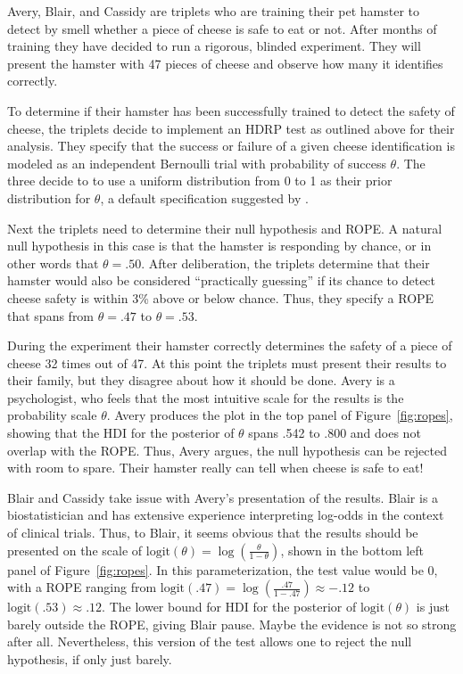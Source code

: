 \documentclass[man]{apa}
\newcommand{\hdr}{HDRP}
\newcommand{\logit}{\text{logit}}
\begin{document}
Avery, Blair, and Cassidy are triplets who are training their pet hamster to detect by smell whether a piece of cheese is safe to eat or not. After months of training they have decided to run a rigorous, blinded experiment. They will present the hamster with 47 pieces of cheese and observe how many it identifies correctly.

To determine if their hamster has been successfully trained to detect the safety of cheese, the triplets decide to implement an \hdr{} test as outlined above for their analysis. They specify that the success or failure of a given cheese identification is modeled as an independent Bernoulli trial with probability of success $\theta$. The three decide to to use a uniform distribution from 0 to 1 as their prior distribution for $\theta$, a default specification suggested by . 

Next the triplets need to determine their null hypothesis and ROPE. A natural null hypothesis in this case is that the hamster is responding by chance, or in other words that $\theta=.50$. After deliberation, the triplets determine that their hamster would also be considered ``practically guessing'' if its chance to detect cheese safety is within 3\% above or below chance. Thus, they specify a ROPE that spans from $\theta=.47$ to $\theta=.53$.

During the experiment their hamster correctly determines the safety of a piece of cheese 32 times out of 47. At this point the triplets must present their results to their family, but they disagree about how it should be done. Avery is a psychologist, who feels that the most intuitive scale for the results is the probability scale $\theta$. Avery produces the plot in the top panel of Figure~\ref{fig:ropes}, showing that the HDI for the posterior of $\theta$ spans .542 to .800 and does not overlap with the ROPE. %
Thus, Avery argues, the null hypothesis can be rejected with room to spare. Their hamster really can tell when cheese is safe to eat!


Blair and Cassidy take issue with Avery's presentation of the results. Blair is a biostatistician and has extensive experience interpreting log-odds in the context of clinical trials. Thus, to Blair, it seems obvious that the results should be presented on the scale of $\logit(\theta)=\log\left(\frac{\theta}{1-\theta}\right)$, shown in the bottom left panel of Figure~\ref{fig:ropes}. In this parameterization, the test value would be 0, with a ROPE ranging from $\logit(.47)=\log\left(\frac{.47}{1-.47}\right)\approx-.12$ to $\logit(.53)\approx.12$. The lower bound for HDI for the posterior of $\logit(\theta)$ is just barely outside the ROPE, giving Blair pause. Maybe the evidence is not so strong after all. Nevertheless, this version of the test allows one to reject the null hypothesis, if only just barely.
\end{document}
